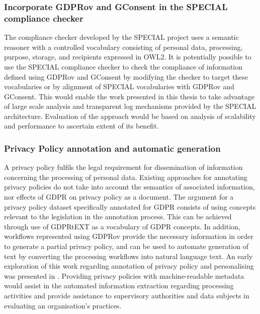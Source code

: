 \subsubsection*{Incorporate GDPRov and GConsent in the SPECIAL compliance checker}
The compliance checker developed by the SPECIAL project \cite{kirrane_scalable_2018} uses a semantic reasoner \cite{bonatti_fast_2018} with a controlled vocabulary consisting of personal data, processing, purpose, storage, and recipients expressed in OWL2. It is potentially possible to use the SPECIAL compliance checker to check the compliance of information defined using GDPRov and GConsent by modifying the checker to target these vocabularies or by alignment of SPECIAL vocabularies with GDPRov and GConsent. This would enable the work presented in this thesis to take advantage of large scale analysis and transparent log mechanisms provided by the SPECIAL architecture. Evaluation of the approach would be based on analysis of scalability and performance to ascertain extent of its benefit.

\subsubsection*{Privacy Policy annotation and automatic generation}
A privacy policy fulfils the legal requirement for dissemination of information concerning the processing of personal data. Existing approaches for annotating privacy policies \cite{harkous_polisis_2018} do not take into account the semantics of associated information, nor effects of GDPR on privacy policy as a document. The argument for a privacy policy dataset specifically annotated for GDPR \cite{galle_case_2019} consists of using concepts relevant to the legislation in the annotation process. This can be achieved through use of GDPRtEXT as a vocabulary of GDPR concepts. In addition, workflows represented using GDPRov provide the necessary information in order to generate a partial privacy policy, and can be used to automate generation of text by converting the processing workflows into natural language text. An early exploration of this work regarding annotation of  privacy policy and personalising was presented in \cite{pandit_personalised_2018}.
Providing privacy policies with machine-readable metadata would assist in the automated information extraction regarding processing activities and provide assistance to supervisory authorities and data subjects in evaluating an organisation's practices.

